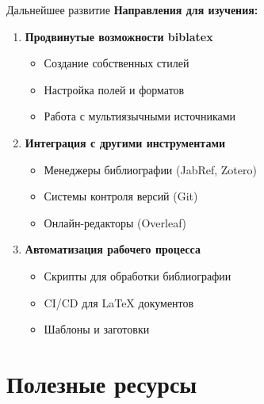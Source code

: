 \documentclass[aspectratio=169, 12pt]{beamer}
\begin{document}
\begin{frame}{Дальнейшее развитие}
  \textbf{Направления для изучения:}
  
  \begin{enumerate}
    \item \textbf{Продвинутые возможности biblatex}
    \begin{itemize}
      \item Создание собственных стилей
      \item Настройка полей и форматов
      \item Работа с мультиязычными источниками
    \end{itemize}
    
    \item \textbf{Интеграция с другими инструментами}
    \begin{itemize}
      \item Менеджеры библиографии (JabRef, Zotero)
      \item Системы контроля версий (Git)
      \item Онлайн-редакторы (Overleaf)
    \end{itemize}
    
    \item \textbf{Автоматизация рабочего процесса}
    \begin{itemize}
      \item Скрипты для обработки библиографии
      \item CI/CD для LaTeX документов
      \item Шаблоны и заготовки
    \end{itemize}
  \end{enumerate}
\end{frame}

\section{Полезные ресурсы}
\end{document}
